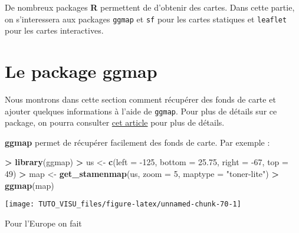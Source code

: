 \documentclass[]{book}
\newenvironment{Shaded}{\begin{snugshade}}{\end{snugshade}}
\newcommand{\DataTypeTok}[1]{\textcolor[rgb]{0.13,0.29,0.53}{#1}}
\newcommand{\DecValTok}[1]{\textcolor[rgb]{0.00,0.00,0.81}{#1}}
\newcommand{\FloatTok}[1]{\textcolor[rgb]{0.00,0.00,0.81}{#1}}
\newcommand{\KeywordTok}[1]{\textcolor[rgb]{0.13,0.29,0.53}{\textbf{#1}}}
\newcommand{\NormalTok}[1]{#1}
\newcommand{\OperatorTok}[1]{\textcolor[rgb]{0.81,0.36,0.00}{\textbf{#1}}}
\newcommand{\StringTok}[1]{\textcolor[rgb]{0.31,0.60,0.02}{#1}}
\theoremstyle{definition}
\theoremstyle{definition}
\theoremstyle{definition}
\theoremstyle{remark}
\begin{document}
De nombreux packages \textbf{R} permettent de d'obtenir des cartes. Dans cette partie, on s'interessera aux packages \texttt{ggmap} et \texttt{sf} pour les cartes statiques et \texttt{leaflet} pour les cartes interactives.

\hypertarget{le-package-ggmap}{%
\section{Le package ggmap}\label{le-package-ggmap}}

Nous montrons dans cette section comment récupérer des fonds de carte et ajouter quelques informations à l'aide de \texttt{ggmap}. Pour plus de détails sur ce package, on pourra consulter \href{https://journal.r-project.org/archive/2013-1/kahle-wickham.pdf}{cet article} pour plus de détails.

\textbf{ggmap} permet de récupérer facilement des fonds de carte. Par exemple :

\begin{Shaded}
\begin{Highlighting}[]
\OperatorTok{>}\StringTok{ }\KeywordTok{library}\NormalTok{(ggmap)}
\OperatorTok{>}\StringTok{ }\NormalTok{us <-}\StringTok{ }\KeywordTok{c}\NormalTok{(}\DataTypeTok{left =} \DecValTok{-125}\NormalTok{, }\DataTypeTok{bottom =} \FloatTok{25.75}\NormalTok{, }\DataTypeTok{right =} \DecValTok{-67}\NormalTok{, }\DataTypeTok{top =} \DecValTok{49}\NormalTok{)}
\OperatorTok{>}\StringTok{ }\NormalTok{map <-}\StringTok{ }\KeywordTok{get_stamenmap}\NormalTok{(us, }\DataTypeTok{zoom =} \DecValTok{5}\NormalTok{, }\DataTypeTok{maptype =} \StringTok{"toner-lite"}\NormalTok{)}
\OperatorTok{>}\StringTok{ }\KeywordTok{ggmap}\NormalTok{(map)}
\end{Highlighting}
\end{Shaded}

\begin{center}\texttt{[image: TUTO\_VISU\_files/figure-latex/unnamed-chunk-70-1]} \end{center}

Pour l'Europe on fait

\begin{Shaded}
\end{Shaded}
\end{document}
